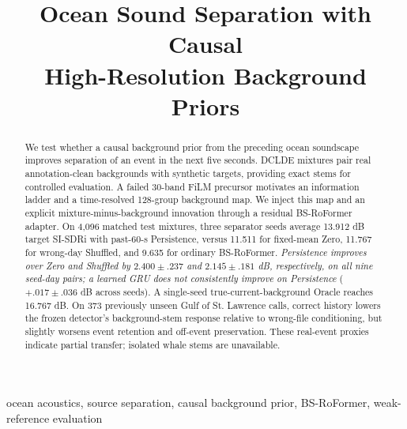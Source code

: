 \documentclass[conference]{IEEEtran}
\title{Ocean Sound Separation with Causal\\High-Resolution Background Priors}
\author{\IEEEauthorblockN{Anonymous Authors}\IEEEauthorblockA{Anonymous Affiliation}}
\begin{document}
\maketitle

\begin{abstract}
We test whether a causal background prior from the preceding ocean soundscape
improves separation of an event in the next five seconds. DCLDE mixtures pair
real annotation-clean backgrounds with synthetic targets, providing exact
stems for controlled evaluation. A failed 30-band FiLM precursor motivates
an information ladder and a time-resolved 128-group background map. We inject
this map and an explicit mixture-minus-background innovation through a
residual BS-RoFormer adapter. On 4,096 matched test mixtures, three separator
seeds average 13.912 dB target SI-SDRi with past-60-s Persistence, versus
11.511 for fixed-mean Zero, 11.767 for wrong-day Shuffled, and 9.635 for
ordinary BS-RoFormer. \emph{Persistence improves over Zero and Shuffled by
$2.400\pm.237$ and $2.145\pm.181$ dB, respectively, on all nine seed-day
pairs; a learned GRU does not consistently improve on Persistence}
($+.017\pm.036$ dB across seeds). A single-seed true-current-background
Oracle reaches 16.767 dB. On 373 previously unseen Gulf of St. Lawrence
calls, correct history lowers the frozen detector's background-stem response
relative to wrong-file conditioning, but slightly worsens event retention
and off-event preservation. These real-event proxies indicate partial
transfer; isolated whale stems are unavailable.
\end{abstract}

\begin{IEEEkeywords}
ocean acoustics, source separation, causal background prior, BS-RoFormer,
weak-reference evaluation
\end{IEEEkeywords}
\end{document}
